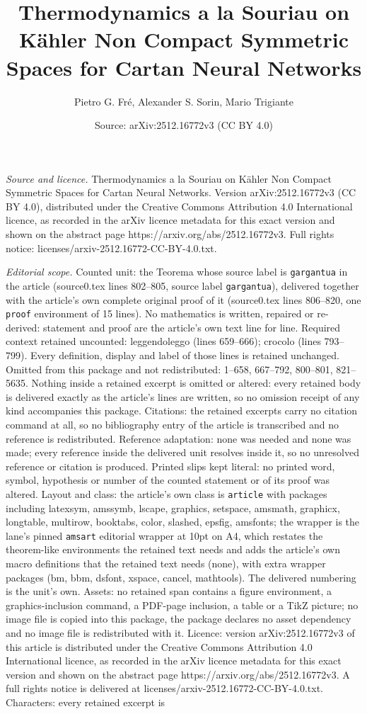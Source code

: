 \documentclass[10pt,a4paper]{amsart}
\title[Thermodynamics a la Souriau on K\"ahler Non Compact Symmetri]{Thermodynamics a la Souriau on K\"ahler Non Compact Symmetric Spaces for Cartan Neural Networks}
\author{Pietro G. Fr\'e, Alexander S. Sorin, Mario Trigiante}
\date{Source: arXiv:2512.16772v3 (CC BY 4.0)}
\begin{document}
\maketitle

\noindent\emph{Source and licence.} Thermodynamics a la Souriau on K\"ahler Non Compact Symmetric Spaces for Cartan Neural Networks. Version arXiv:2512.16772v3 (CC BY 4.0), distributed under the Creative Commons Attribution 4.0 International licence, as recorded in the arXiv licence metadata for this exact version and shown on the abstract page https://arxiv.org/abs/2512.16772v3. Full rights notice: licenses/arxiv-2512.16772-CC-BY-4.0.txt.\par\smallskip

\noindent\textit{Editorial scope.} Counted unit: the Teorema whose source label is \texttt{gargantua} in the article (source0.tex lines 802--805, source label \texttt{gargantua}), delivered together with the article's own complete original proof of it (source0.tex lines 806--820, one \texttt{proof} environment of 15 lines). No mathematics is written, repaired or re-derived: statement and proof are the article's own text line for line. Required context retained uncounted: leggendoleggo (lines 659--666); crocolo (lines 793--799). Every definition, display and label of those lines is retained unchanged. Omitted from this package and not redistributed: 1--658, 667--792, 800--801, 821--5635. Nothing inside a retained excerpt is omitted or altered: every retained body is delivered exactly as the article's lines are written, so no omission receipt of any kind accompanies this package. Citations: the retained excerpts carry no citation command at all, so no bibliography entry of the article is transcribed and no reference is redistributed. Reference adaptation: none was needed and none was made; every reference inside the delivered unit resolves inside it, so no unresolved reference or citation is produced. Printed slips kept literal: no printed word, symbol, hypothesis or number of the counted statement or of its proof was altered. Layout and class: the article's own class is \texttt{article} with packages including latexsym, amssymb, lscape, graphics, setspace, amsmath, graphicx, longtable, multirow, booktabs, color, slashed, epsfig, amsfonts; the wrapper is the lane's pinned \texttt{amsart} editorial wrapper at 10pt on A4, which restates the theorem-like environments the retained text needs and adds the article's own macro definitions that the retained text needs (none), with extra wrapper packages (bm, bbm, dsfont, xspace, cancel, mathtools). The delivered numbering is the unit's own. Assets: no retained span contains a figure environment, a graphics-inclusion command, a PDF-page inclusion, a table or a TikZ picture; no image file is copied into this package, the package declares no asset dependency and no image file is redistributed with it. Licence: version arXiv:2512.16772v3 of this article is distributed under the Creative Commons Attribution 4.0 International licence, as recorded in the arXiv licence metadata for this exact version and shown on the abstract page https://arxiv.org/abs/2512.16772v3. A full rights notice is delivered at licenses/arxiv-2512.16772-CC-BY-4.0.txt. Characters: every retained excerpt is 
\end{document}
